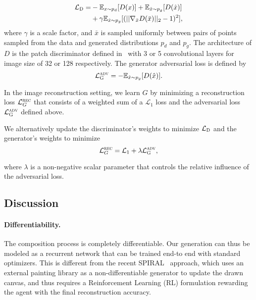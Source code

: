 \documentclass[10pt,twocolumn,letterpaper]{article}
\begin{document}
\begin{equation} \label{eq:disc_loss}
\begin{split}
\mathcal{L}_\textsc{D} =& -\mathbb{E}_{x \sim p_{d}}[D(x)] + \mathbb{E}_{\hat{x} \sim p_{g}}[D(\hat{x})]  \\
& + \gamma\mathbb{E}_{\hat{x} \sim p_{g}}[(||\nabla_{\bar{x}} D(\bar{x})||_2 - 1)^2],
\end{split}
\end{equation}
where $\gamma$ is a scale factor, and $\bar{x}$ is sampled uniformly between pairs of points sampled from the data and generated distributions $p_d$ and $p_g$.
The architecture of $D$ is the patch discriminator defined in~\cite{Isola2016ImageToImage} with 3 or 5 convolutional layers for image size of 32 or 128 respectively.
The generator adversarial loss is defined by
\begin{equation} \label{eq:gen_wgan_loss}
    \mathcal{L}^{\textsc{adv}}_\textsc{G}=-\mathbb{E}_{\hat{x} \sim p_{g}}[D(\hat{x})].
\end{equation}

In the image reconstruction setting, we learn $G$ by minimizing a reconstruction loss $\mathcal{L}^{\textsc{rec}}_G$ that consists of a weighted sum of a $\mathcal{L}_1$ loss and the adversarial loss $\mathcal{L}^{\textsc{adv}}_\textsc{G}$ defined above. 

We alternatively update the discriminator's weights to minimize $\mathcal{L}_\textsc{D}$ and the 
generator's weights to minimize
\begin{equation} \mathcal{L}^{\textsc{rec}}_G = \mathcal{L}_1 + \lambda \mathcal{L}^{\textsc{adv}}_\textsc{G},
\end{equation}

where $\lambda$ is a non-negative scalar parameter that controls the relative influence of the adversarial loss. 

\subsection{Discussion}
\paragraph{Differentiability.} The composition process is completely differentiable. 
Our generation can thus be modeled as a recurrent network that can be trained end-to end with standard optimizers. This is different from the recent SPIRAL~\cite{ganin2018synthesizing} approach, which uses an external painting library as a non-differentiable generator to update the drawn canvas, and thus requires a Reinforcement Learning (RL) formulation rewarding the agent with the final reconstruction accuracy.
\end{document}
